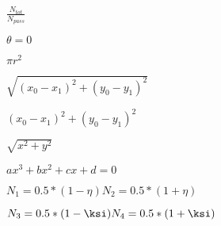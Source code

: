 \documentclass{article}
\begin{document}
$ \frac{N_{tot}}{N_{pass}}$
\pagebreak

$ \theta = 0 $
\pagebreak

$ \pi r^2 $
\pagebreak

$ \sqrt{(x_0-x_1)^2 + (y_0-y_1)^2} $
\pagebreak

$ (x_0-x_1)^2 + (y_0-y_1)^2 $
\pagebreak

$ \sqrt{x^2 + y^2} $
\pagebreak

$ax^3 + bx^2 + cx + d = 0$
\pagebreak

$N_1 = 0.5*(1-\eta) N_2 = 0.5*(1+\eta)$
\pagebreak

$N_3 = 0.5*(1-\ksi) N_4 = 0.5*(1+\ksi)$
\pagebreak
\end{document}
